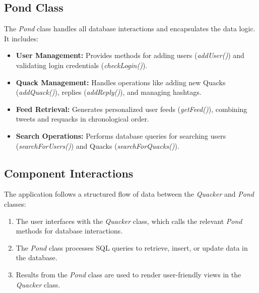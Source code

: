 \documentclass[12pt]{article}
\begin{document}
	\subsection*{Pond Class}
	The \textit{Pond} class handles all database interactions and encapsulates the data logic. It includes:
	\begin{itemize}
		\item \textbf{User Management:} Provides methods for adding users (\textit{addUser()}) and validating login credentials (\textit{checkLogin()}).
		\item \textbf{Quack Management:} Handles operations like adding new Quacks (\textit{addQuack()}), replies (\textit{addReply()}), and managing hashtags.
		\item \textbf{Feed Retrieval:} Generates personalized user feeds (\textit{getFeed()}), combining tweets and requacks in chronological order.
		\item \textbf{Search Operations:} Performs database queries for searching users (\textit{searchForUsers()}) and Quacks (\textit{searchForQuacks()}).
	\end{itemize}

	\subsection*{Component Interactions}
	The application follows a structured flow of data between the \textit{Quacker} and \textit{Pond} classes:
	\begin{enumerate}
		\item The user interfaces with the \textit{Quacker} class, which calls the relevant \textit{Pond} methods for database interactions.
		\item The \textit{Pond} class processes SQL queries to retrieve, insert, or update data in the database.
		\item Results from the \textit{Pond} class are used to render user-friendly views in the \textit{Quacker} class.
	\end{enumerate}

\newpage

\end{document}
